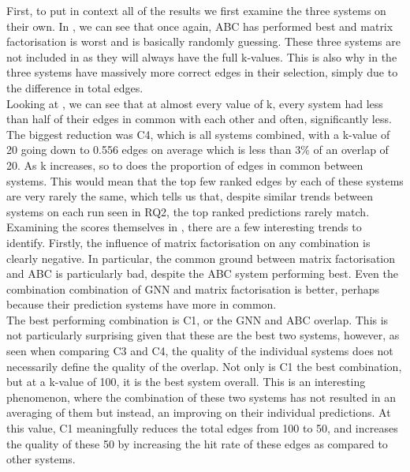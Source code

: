 \documentclass{l4proj}
\begin{document}
First, to put in context all of the results we first examine the three systems on their own. In , we can see that once again, ABC has performed best and matrix factorisation is worst and is basically randomly guessing. These three systems are not included in  as they will always have the full k-values. This is also why in  the three systems have massively more correct edges in their selection, simply due to the difference in total edges. \\

Looking at , we can see that at almost every value of k, every system had less than half of their edges in common with each other and often, significantly less. The biggest reduction was C4, which is all systems combined, with a k-value of 20 going down to 0.556 edges on average which is less than 3\% of an overlap of 20. As k increases, so to does the proportion of edges in common between systems. This would mean that the top few ranked edges by each of these systems are very rarely the same, which tells us that, despite similar trends between systems on each run seen in RQ2, the top ranked predictions rarely match. \\

Examining the scores themselves in , there are a few interesting trends to identify. Firstly, the influence of matrix factorisation on any combination is clearly negative. In particular, the common ground between matrix factorisation and ABC is particularly bad, despite the ABC system performing best. Even the combination combination of GNN and matrix factorisation is better, perhaps because their prediction systems have more in common. \\

The best performing combination is C1, or the GNN and ABC overlap. This is not particularly surprising given that these are the best two systems, however, as seen when comparing C3 and C4, the quality of the individual systems does not necessarily define the quality of the overlap. Not only is C1 the best combination, but at a k-value of 100, it is the best system overall. This is an interesting phenomenon, where the combination of these two systems has not resulted in an averaging of them but instead, an improving on their individual predictions. At this value, C1 meaningfully reduces the total edges from 100 to 50, and increases the quality of these 50 by increasing the hit rate of these edges as compared to other systems. \\
\end{document}

